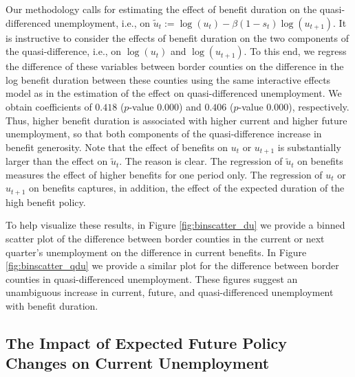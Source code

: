 \documentclass[12pt]{article}
\newcommand{\1}{\mathbf{1}}
\begin{document}
Our methodology calls for estimating the effect of benefit duration on the quasi-differenced unemployment, i.e., on $\tilde{u}_t := \log(u_t) - \beta (1-s_t) \log(u_{t+1})$. It is instructive to consider the effects of benefit duration on the two components of the quasi-difference, i.e., on $\log(u_t)$ and $\log(u_{t+1})$. To this end, we regress the difference of these variables between border counties on the difference in the log benefit duration between these counties using the same interactive effects model as in the estimation of the effect on quasi-differenced unemployment. We obtain coefficients of $0.418$ ($p$-value 0.000) and  $0.406$ ($p$-value 0.000), respectively. Thus, higher benefit duration is associated with higher current and higher future unemployment, so that both components of the quasi-difference increase in benefit generosity. Note that the effect of benefits on $u_t$ or $u_{t+1}$ is substantially larger than the effect on $\tilde{u}_t$. The reason is clear. The regression of $\tilde{u}_t$ on benefits measures the effect of higher benefits for one period only. The regression of $u_t$ or $u_{t+1}$ on benefits captures, in addition, the effect of the expected duration of the high benefit policy.

To help visualize these results, in Figure \ref{fig:binscatter_du} we provide a binned scatter plot of the difference between border counties in the current or next quarter's unemployment on the difference in current benefits. In Figure \ref{fig:binscatter_qdu} we provide a similar plot for the difference between border counties in quasi-differenced unemployment. These figures suggest an unambiguous increase in current, future, and quasi-differenced unemployment with benefit duration.

\subsection{The Impact of Expected Future Policy Changes on Current Unemployment}
\label{sec:forward_spec}
\end{document}
